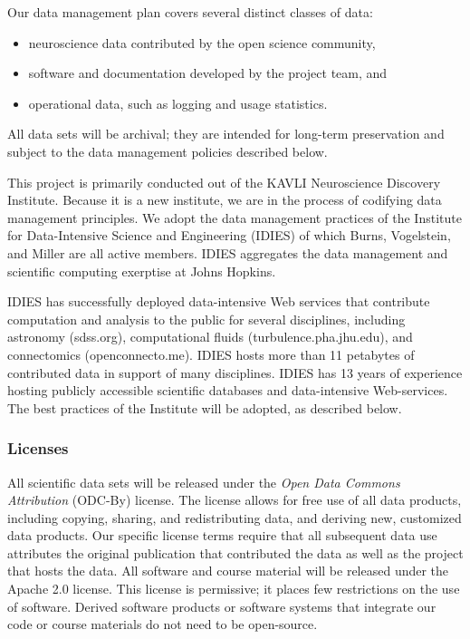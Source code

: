 
Our data management plan covers several distinct classes of data: 
\begin{itemize}
\addtolength{\itemsep}{-5pt}
\item neuroscience data contributed by the open science community,
\item software and documentation developed by the project team, and 
\item operational data, such as logging and usage statistics.
\end{itemize}
\vspace{-5pt}
All data sets will be archival; they are intended for long-term preservation and
subject to the data management policies described below.

This project is primarily conducted out of the KAVLI Neuroscience Discovery 
Institute.  Because it is a new institute, we are in the process of codifying 
data management principles.  We adopt the data management practices of 
the Institute for Data-Intensive Science and Engineering (IDIES) of which 
Burns, Vogelstein, and Miller are all active members.  IDIES aggregates the
data management and scientific computing exerptise at Johns Hopkins.

IDIES has successfully deployed data-intensive Web services that contribute 
computation and analysis to the public for several disciplines, including astronomy (sdss.org), 
computational fluids (turbulence.pha.jhu.edu), and connectomics 
(openconnecto.me). IDIES hosts more than 11 petabytes of contributed data in support of 
many disciplines.  IDIES has 13 years of experience 
hosting publicly accessible scientific databases and data-intensive Web-services. The best 
practices of the Institute will be adopted, as described below.

\subsubsection*{Licenses}
All scientific data sets will be released under the {\em Open Data Commons Attribution} (ODC-By) license.
The license allows for free use of all data products, including copying, sharing, and redistributing data, and
deriving new, customized data products.  Our specific license terms require that all subsequent
data use attributes the original publication that contributed the data as well as the project 
that hosts the data.  
All software and course material will be released under the Apache 2.0 license. This license is 
permissive; it places few restrictions on the use of software.
Derived software products or software systems that integrate our code or course materials 
do not need to be open-source.

